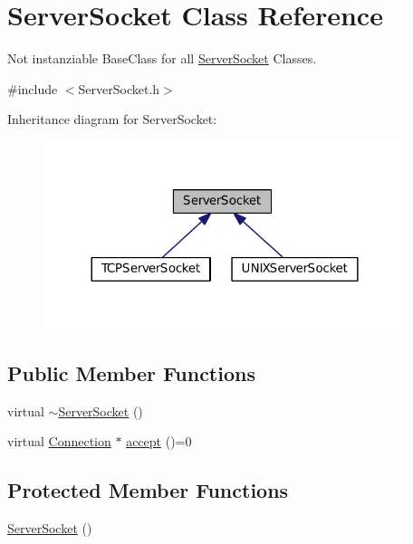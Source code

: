 \hypertarget{classServerSocket}{\section{Server\+Socket Class Reference}
\label{classServerSocket}
}


Not instanziable Base\+Class for all \hyperlink{classServerSocket}{Server\+Socket} Classes.  




{\ttfamily \#include $<$Server\+Socket.\+h$>$}



Inheritance diagram for Server\+Socket\+:
\nopagebreak
\begin{figure}[H]
\begin{center}
\leavevmode
\includegraphics[width=300pt]{classServerSocket__inherit__graph}
\end{center}
\end{figure}
\subsection*{Public Member Functions}
\begin{DoxyCompactItemize}
\item 
virtual \hyperlink{classServerSocket_a510674d924c2544e6b0069e39c36516b}{$\sim$\+Server\+Socket} ()
\item 
virtual \hyperlink{classConnection}{Connection} $\ast$ \hyperlink{classServerSocket_a1d7054bc388f2d789d2124dd96939d90}{accept} ()=0
\end{DoxyCompactItemize}
\subsection*{Protected Member Functions}
\begin{DoxyCompactItemize}
\item 
\hyperlink{classServerSocket_a2b3098589541243241ca25495155186c}{Server\+Socket} ()
\end{DoxyCompactItemize}


